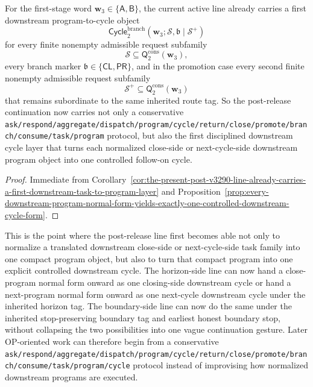 \begin{corollary}
\label{cor:the-present-post-v3290-line-already-carries-a-first-downstream-program-to-cycle-layer}
For the first-stage word \(\mathbf w_3\in\{\mathsf A,\mathsf B\}\), the current active line already carries a first downstream program-to-cycle object
\[
 \mathsf{Cycle}^{\mathrm{branch}}_{2}(\mathbf w_3;\mathcal S,\mathfrak b\mid\mathcal S^{+})
\]
for every finite nonempty admissible request subfamily
\[
 \mathcal S\subseteq \mathsf{Q}^{\mathrm{cons}}_{2}(\mathbf w_3),
\]
every branch marker \(\mathfrak b\in\{\mathsf{CL},\mathsf{PR}\}\), and in the promotion case every second finite nonempty admissible request subfamily
\[
 \mathcal S^{+}\subseteq \mathsf{Q}^{\mathrm{cons}}_{2}(\mathbf w_3)
\]
that remains subordinate to the same inherited route tag. So the post-release continuation now carries not only a conservative {\nolinkurl{ask/respond/aggregate/dispatch/program/cycle/return/close/promote/branch/consume/task/program}} protocol, but also the first disciplined downstream cycle layer that turns each normalized close-side or next-cycle-side downstream program object into one controlled follow-on cycle.
\end{corollary}

\begin{proof}
Immediate from Corollary~\ref{cor:the-present-post-v3290-line-already-carries-a-first-downstream-task-to-program-layer} and Proposition~\ref{prop:every-downstream-program-normal-form-yields-exactly-one-controlled-downstream-cycle-form}.
\end{proof}

\begin{remark}
\label{rem:what-the-first-downstream-program-to-cycle-layer-now-buys}
This is the point where the post-release line first becomes able not only to normalize a translated downstream close-side or next-cycle-side task family into one compact program object, but also to turn that compact program into one explicit controlled downstream cycle. The horizon-side line can now hand a close-program normal form onward as one closing-side downstream cycle or hand a next-program normal form onward as one next-cycle downstream cycle under the inherited horizon tag. The boundary-side line can now do the same under the inherited stop-preserving boundary tag and earliest honest boundary stop, without collapsing the two possibilities into one vague continuation gesture. Later OP-oriented work can therefore begin from a conservative {\nolinkurl{ask/respond/aggregate/dispatch/program/cycle/return/close/promote/branch/consume/task/program/cycle}} protocol instead of improvising how normalized downstream programs are executed.
\end{remark}


